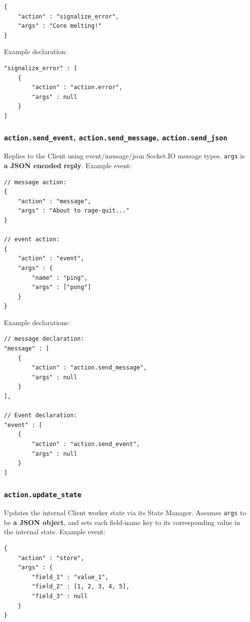 \documentclass[a4paper]{article}
\begin{document}
\begin{verbatim}
{
    "action" : "signalize_error",
    "args" : "Core melting!"
}
\end{verbatim}




\noindent
Example declaration:

\begin{verbatim}
"signalize_error" : [
    {
        "action" : "action.error",
        "args" : null
    }
]
\end{verbatim}
\subsubsection{\texttt{action.send\_event}, \texttt{action.send\_message}, \texttt{action.send\_json}}
\label{sec-8-3-3}

Replies to the Client using event/message/json Socket.IO message types. \texttt{args} is \textbf{a JSON encoded reply}. Example event:

\begin{verbatim}
// message action:
{
    "action" : "message",
    "args" : "About to rage-quit..."
}

// event action:
{
    "action" : "event",
    "args" : {
        "name" : "ping",
        "args" : ["pong"]
    }
}
\end{verbatim}




\noindent
Example declarations:

\begin{verbatim}
// message declaration:
"message" : [
    {
        "action" : "action.send_message",
        "args" : null
    }
],

// Event declaration:
"event" : [
    {
        "action" : "action.send_event",
        "args" : null
    }
]
\end{verbatim}
\subsubsection{\texttt{action.update\_state}}
\label{sec-8-3-4}

Updates the internal Client worker state via its State Manager. Assumes \texttt{args} to be \textbf{a JSON object}, and sets each field-name key to its corresponding value in the internal state. Example event:

\begin{verbatim}
{
    "action" : "store",
    "args" : {
        "field_1" : "value_1",
        "field_2" : [1, 2, 3, 4, 5],
        "field_3" : null
    }
}
\end{verbatim}
\end{document}
